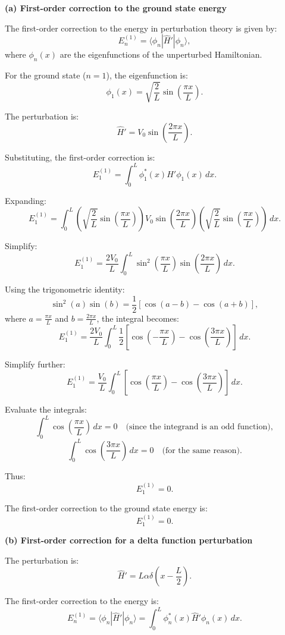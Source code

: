 \textbf{(a) First-order correction to the ground state energy}

The first-order correction to the energy in perturbation theory is given by:
\[
E_n^{(1)} = \langle \phi_n | \hat{H}' | \phi_n \rangle,
\]
where \(\phi_n(x)\) are the eigenfunctions of the unperturbed Hamiltonian.

For the ground state (\(n = 1\)), the eigenfunction is:
\[
\phi_1(x) = \sqrt{\frac{2}{L}} \sin\left(\frac{\pi x}{L}\right).
\]

The perturbation is:
\[
\hat{H}' = V_0 \sin\left(\frac{2\pi x}{L}\right).
\]

Substituting, the first-order correction is:
\[
E_1^{(1)} = \int_0^L \phi_1^*(x) \hat{H}' \phi_1(x) \, dx.
\]

Expanding:
\[
E_1^{(1)} = \int_0^L \left(\sqrt{\frac{2}{L}} \sin\left(\frac{\pi x}{L}\right)\right) V_0 \sin\left(\frac{2\pi x}{L}\right) \left(\sqrt{\frac{2}{L}} \sin\left(\frac{\pi x}{L}\right)\right) \, dx.
\]

Simplify:
\[
E_1^{(1)} = \frac{2 V_0}{L} \int_0^L \sin^2\left(\frac{\pi x}{L}\right) \sin\left(\frac{2\pi x}{L}\right) \, dx.
\]

Using the trigonometric identity:
\[
\sin^2(a) \sin(b) = \frac{1}{2} \left[\cos(a-b) - \cos(a+b)\right],
\]
where \(a = \frac{\pi x}{L}\) and \(b = \frac{2\pi x}{L}\), the integral becomes:
\[
E_1^{(1)} = \frac{2 V_0}{L} \int_0^L \frac{1}{2} \left[\cos\left(-\frac{\pi x}{L}\right) - \cos\left(\frac{3\pi x}{L}\right)\right] \, dx.
\]

Simplify further:
\[
E_1^{(1)} = \frac{V_0}{L} \int_0^L \left[\cos\left(\frac{\pi x}{L}\right) - \cos\left(\frac{3\pi x}{L}\right)\right] \, dx.
\]

Evaluate the integrals:
\[
\int_0^L \cos\left(\frac{\pi x}{L}\right) \, dx = 0 \quad \text{(since the integrand is an odd function)},
\]
\[
\int_0^L \cos\left(\frac{3\pi x}{L}\right) \, dx = 0 \quad \text{(for the same reason)}.
\]

Thus:
\[
E_1^{(1)} = 0.
\]

The first-order correction to the ground state energy is:
\[
E_1^{(1)} = 0.
\]

\textbf{(b) First-order correction for a delta function perturbation}

The perturbation is:
\[
\hat{H}' = L \alpha \delta\left(x - \frac{L}{2}\right).
\]

The first-order correction to the energy is:
\[
E_n^{(1)} = \langle \phi_n | \hat{H}' | \phi_n \rangle = \int_0^L \phi_n^*(x) \hat{H}' \phi_n(x) \, dx.
\]

